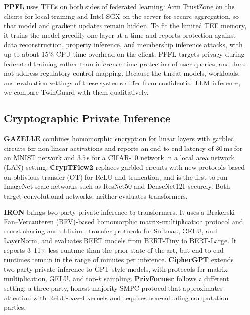 \documentclass{ieeeaccess}
\begin{document}
\textbf{PPFL} \cite{mo2021ppfl} uses TEEs on both sides of federated learning:
Arm TrustZone on the clients for local training and Intel SGX on the server
for secure aggregation, so that model and gradient updates remain hidden.
To fit the limited TEE memory, it trains the model greedily one layer at a
time and reports protection against data reconstruction, property inference,
and membership inference attacks, with up to about 15\% CPU-time overhead on
the client. PPFL targets privacy during federated training rather than
inference-time protection of user queries, and does not address regulatory
control mapping. Because the threat models, workloads, and evaluation
settings of these systems differ from confidential LLM inference, we compare
TwinGuard with them qualitatively.

\subsection{Cryptographic Private Inference}

\textbf{GAZELLE} \cite{juvekar2018gazelle} combines homomorphic encryption for
linear layers with garbled circuits for non-linear activations and reports an
end-to-end latency of 30\,ms for an MNIST network and 3.6\,s for a CIFAR-10
network in a local area network (LAN) setting. \textbf{CrypTFlow2} \cite{rathee2020cryptflow2}
replaces garbled circuits with new protocols based on oblivious transfer (OT) for
ReLU and truncation, and is the first to run ImageNet-scale networks such as
ResNet50 and DenseNet121 securely. Both target convolutional networks; neither
evaluates transformers.

\textbf{IRON} \cite{hao2022iron} brings two-party private inference to
transformers. It uses a Brakerski--Fan--Vercauteren (BFV)-based homomorphic
matrix-multiplication protocol
and secret-sharing and oblivious-transfer protocols for Softmax, GELU, and
LayerNorm, and evaluates BERT models from BERT-Tiny to BERT-Large. It reports
3--11$\times$ less runtime than the prior state of the art, but end-to-end
runtimes remain in the range of minutes per inference.
\textbf{CipherGPT} \cite{dong2023ciphergpt} extends two-party private
inference to GPT-style models, with protocols for matrix multiplication, GELU,
and top-$k$ sampling. \textbf{PrivFormer} \cite{akimoto2023privformer}
follows a different setting: a three-party, honest-majority SMPC protocol
that approximates attention with ReLU-based kernels and requires
non-colluding computation parties.
\end{document}
